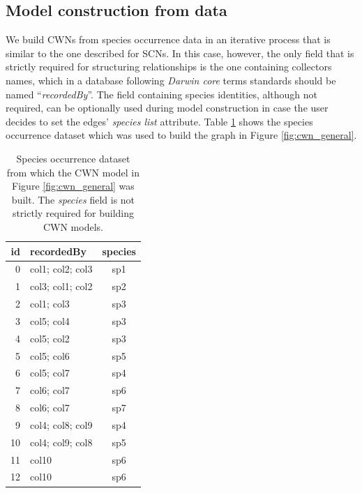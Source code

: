 {%
\subsection{Model construction from data}

We build CWNs from species occurrence data in an iterative process that is similar to the one described for SCNs.
In this case, however, the only field that is strictly required for structuring relationships is the one containing collectors names, which in a database following \textit{Darwin core} terms standards should be named ``\textit{recordedBy}''.
The field containing species identities, although not required, can be optionally used during model construction in case the user decides to set the edges' \textit{species list} attribute.
Table \ref{table:cwn_example_dataset} shows the species occurrence dataset which was used to build the graph in Figure \ref{fig:cwn_general}.

\begin{table}[!ht]
  \caption{Species occurrence dataset from which the CWN model in Figure \ref{fig:cwn_general} was built. The \textit{species} field is not strictly required for building CWN models.}
  \begin{center}
  \begin{tabular}{r l c}
      id & recordedBy & species \\
      \hline
        0 & col1; col2; col3 & sp1\\ 
        1 & col3; col1; col2 & sp2\\ 
        2 & col1; col3 & sp3\\ 
        3 & col5; col4 & sp3\\ 
        4 & col5; col2 & sp3\\ 
        5 & col5; col6 & sp5\\ 
        6 & col5; col7 & sp4\\ 
        7 & col6; col7 & sp6\\ 
        8 & col6; col7 & sp7\\ 
        9 & col4; col8; col9 & sp4\\ 
        10 & col4; col9; col8 & sp5\\ 
        11 & col10 & sp6\\ 
        12 & col10 & sp6\\
       \hline
  \end{tabular}
  \end{center}
  \label{table:cwn_example_dataset}
\end{table}

}
